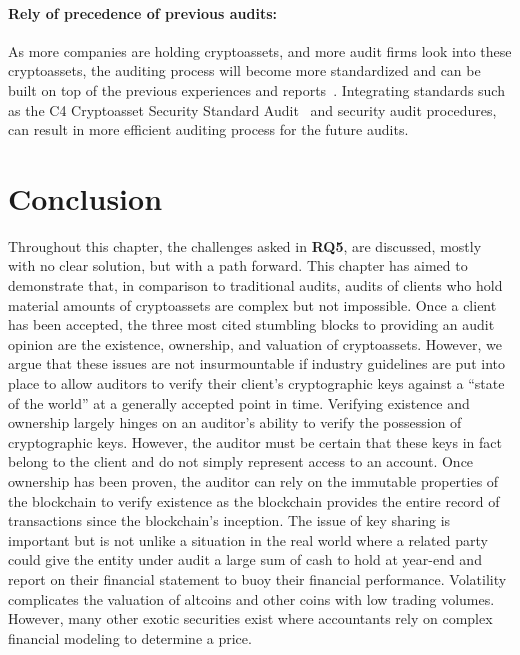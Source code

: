 \paragraph{Rely of precedence of previous audits:} As more companies are holding cryptoassets, and more audit firms look into these cryptoassets, the auditing process will become more standardized and can be built on top of the previous experiences and reports~\cite{cpabauditingcrypto,han2023accounting}. Integrating standards such as the C4 Cryptoasset Security Standard Audit~\cite{c4ccssa} and security audit procedures, can result in more efficient auditing process for the future audits.








\section{Conclusion} \label{sec:auditing:conclusion}
Throughout this chapter, the challenges asked in \textbf{RQ5}, are discussed, mostly with no clear solution, but with a path forward. This chapter has aimed to demonstrate that, in comparison to traditional audits, audits of clients who hold material amounts of cryptoassets are complex but not impossible. Once a client has been accepted, the three most cited stumbling blocks to providing an audit opinion are the existence, ownership, and valuation of cryptoassets. However, we argue that these issues are not insurmountable if industry guidelines are put into place to allow auditors to verify their client's cryptographic keys against a ``state of the world'' at a generally accepted point in time. Verifying existence and ownership largely hinges on an auditor's ability to verify the possession of cryptographic keys. However, the auditor must be certain that these keys in fact belong to the client and do not simply represent access to an account. Once ownership has been proven, the auditor can rely on the immutable properties of the blockchain to verify existence as the blockchain provides the entire record of transactions since the blockchain's inception. The issue of key sharing is important but is not unlike a situation in the real world where a related party could give the entity under audit a large sum of cash to hold at year-end and report on their financial statement to buoy their financial performance. Volatility complicates the valuation of altcoins and other coins with low trading volumes. However, many other exotic securities exist where accountants rely on complex financial modeling to determine a price.

